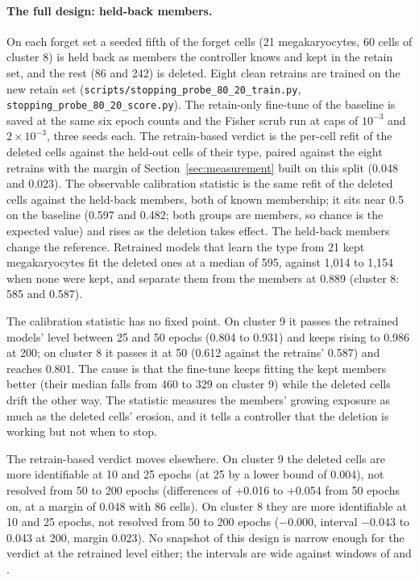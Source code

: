 \documentclass{article}
\begin{document}
\paragraph{The full design: held-back members.} On each forget set a seeded fifth of the forget cells (21 megakaryocytes, 60 cells of cluster 8) is held back as members the controller knows and kept in the retain set, and the rest (86 and 242) is deleted. Eight clean retrains are trained on the new retain set (\texttt{scripts/stopping\_probe\_80\_20\_train.py}, \texttt{stopping\_probe\_80\_20\_score.py}). The retain-only fine-tune of the baseline is saved at the same six epoch counts and the Fisher scrub run at caps of $10^{-3}$ and $2\times 10^{-3}$, three seeds each. The retrain-based verdict is the per-cell refit of the deleted cells against the held-out cells of their type, paired against the eight retrains with the margin of Section~\ref{sec:measurement} built on this split (0.048 and 0.023). The observable calibration statistic is the same refit of the deleted cells against the held-back members, both of known membership; it sits near 0.5 on the baseline (0.597 and 0.482; both groups are members, so chance is the expected value) and rises as the deletion takes effect. The held-back members change the reference. Retrained models that learn the type from 21 kept megakaryocytes fit the deleted ones at a median of 595, against 1,014 to 1,154 when none were kept, and separate them from the members at 0.889 (cluster 8: 585 and 0.587).

The calibration statistic has no fixed point. On cluster 9 it passes the retrained models' level between 25 and 50 epochs (0.804 to 0.931) and keeps rising to 0.986 at 200; on cluster 8 it passes it at 50 (0.612 against the retrains' 0.587) and reaches 0.801. The cause is that the fine-tune keeps fitting the kept members better (their median falls from 460 to 329 on cluster 9) while the deleted cells drift the other way. The statistic measures the members' growing exposure as much as the deleted cells' erosion, and it tells a controller that the deletion is working but not when to stop.

The retrain-based verdict moves elsewhere. On cluster 9 the deleted cells are more identifiable at 10 and 25 epochs (at 25 by a lower bound of 0.004), not resolved from 50 to 200 epochs (differences of +0.016 to +0.054 from 50 epochs on, at a margin of 0.048 with 86 cells). On cluster 8 they are more identifiable at 10 and 25 epochs, not resolved from 50 to 200 epochs ($-0.000$, interval $-0.043$ to 0.043 at 200, margin 0.023). No snapshot of this design is narrow enough for the verdict at the retrained level either; the intervals are  wide against windows of  and .
\end{document}
